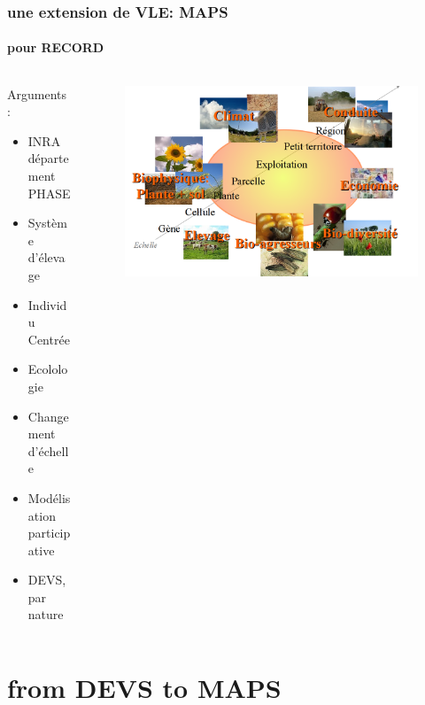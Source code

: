 \documentclass[xetex, compress, table, svgnames]{beamer}
\begin{document}
\begin{frame}
  \frametitle{une extension de VLE: MAPS}
  \framesubtitle{pour RECORD}
  \begin{columns}
    \begin{column}{.50\textwidth}
      \begin{block}{Arguments :}
        \begin{itemize}
        \item INRA département PHASE
        \item Système d'élevage
        \item Individu Centrée
        \item Ecolologie
        \item Changement d'échelle
        \item Modélisation participative
        \item DEVS, par nature
        \end{itemize}
      \end{block}
    \end{column}
    \begin{column}{.50\textwidth}
      \begin{figure}
        \centering
        \includegraphics[width=1.0\textwidth]{fig/ContourRECORD}
      \end{figure}
    \end{column}
  \end{columns}
\end{frame}

\section{from DEVS to MAPS}
\end{document}
